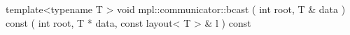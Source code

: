 template<typename T >
void mpl::communicator::bcast
   ( int  root, T &  data ) const
   ( int  root, T *  data, const layout< T > &  l ) const
